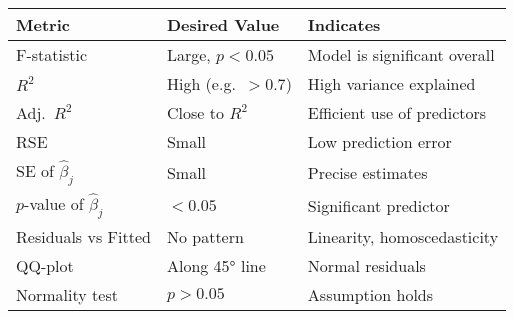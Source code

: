 \documentclass[10pt]{article}
\begin{document}
\begin{center}
  \begin{tabular}{|l|l|l|}
    \hline
    \textbf{Metric}            & \textbf{Desired Value} & \textbf{Indicates}           \\
    \hline
    F-statistic                & Large, $p<0.05$        & Model is significant overall \\
    $R^2$                      & High (e.g.\ $>0.7$)    & High variance explained      \\
    Adj.\ $R^2$                & Close to $R^2$         & Efficient use of predictors  \\
    RSE                        & Small                  & Low prediction error         \\
    SE of $\hat\beta_j$        & Small                  & Precise estimates            \\
    $p$-value of $\hat\beta_j$ & $<0.05$                & Significant predictor        \\
    Residuals vs Fitted        & No pattern             & Linearity, homoscedasticity  \\
    QQ-plot                    & Along 45° line         & Normal residuals             \\
    Normality test             & $p>0.05$               & Assumption holds             \\
    \hline
  \end{tabular}
\end{center}
\end{document}
